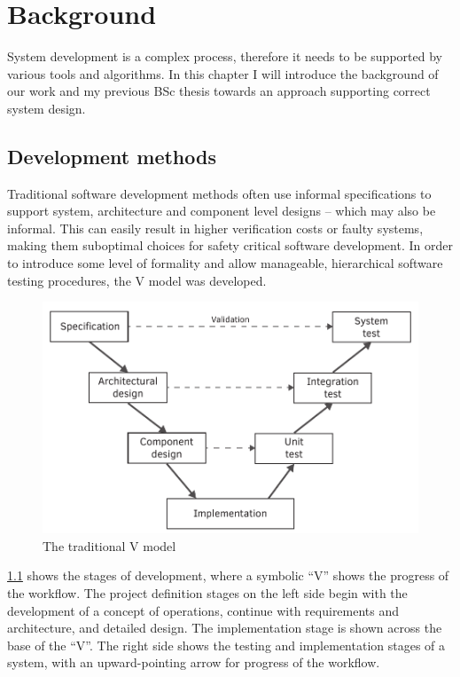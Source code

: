 \chapter{Background}
\label{chap:background}

System development is a complex process, therefore it needs to be supported by various tools and algorithms. In this chapter I will introduce the background of our work \citep{tdk2015} and my previous BSc thesis \citep{bsc_thesis} towards an approach supporting correct system design.

\section{Development methods}


Traditional software development methods often use informal specifications to support system, architecture and component level designs -- which may also be informal. This can easily result in higher verification costs or faulty systems, making them suboptimal choices for safety critical software development. In order to introduce some level of formality and allow manageable, hierarchical software testing procedures, the V model was developed.

\begin{figure}[h]
	\centering
	\includegraphics[width=0.8\linewidth]{figures/chapter_2/vmodel}
	\caption{The traditional V model\citep{vmodel} \redraw }
	\label{fig:intro:vmodel}
\end{figure}

\cref{fig:intro:vmodel} shows the stages of development, where a symbolic ``V'' shows the progress of the workflow. The project definition stages on the left side begin with the development of a concept of operations, continue with requirements and architecture, and detailed design. The implementation stage is shown across the base of the ``V''. The right side shows the testing and implementation stages of a system, with an upward-pointing arrow for progress of the workflow\citep{vmodel}. 

